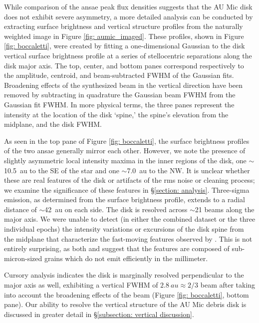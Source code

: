 \documentclass[modern]{aastex62}
\begin{document}
While comparison of the ansae peak flux densities suggests that the AU Mic disk does not exhibit severe asymmetry, a more detailed analysis can be conducted by extracting surface brightness and vertical structure profiles from the naturally weighted image in Figure \ref{fig: aumic_imaged}.
These profiles, shown in Figure \ref{fig: boccaletti}, were created by fitting a one-dimensional Gaussian to the disk vertical surface brightness profile at a series of stellocentric separations along the disk major axis.
The top, center, and bottom panes correspond respectively to the amplitude, centroid, and beam-subtracted FWHM of the Gaussian fits. 
Broadening effects of the synthesized beam in the vertical direction have been removed by subtracting in quadrature the Gaussian beam FWHM from the Gaussian fit FWHM.
In more physical terms, the three panes represent the intensity at the location of the disk `spine,' the spine's elevation from the midplane, and the disk FWHM.

As seen in the top pane of Figure \ref{fig: boccaletti}, the surface brightness profiles of the two ansae generally mirror each other.
However, we note the presence of slightly asymmetric local intensity maxima in the inner regions of the disk, one $\sim$\SI{10.5}{au} to the SE of the star and one $\sim$\SI{7.0}{au} to the NW. 
It is unclear whether these are real features of the disk or artifacts of the rms noise or cleaning process; we examine the significance of these features in \S \ref{section: analysis}.
Three-sigma emission, as determined from the surface brightness profile, extends to a radial distance of $\sim$\SI{42}{au} on each side.
The disk is resolved across $\sim$21 beams along the major axis. 
We were unable to detect (in either the combined dataset or the three individual epochs) the intensity variations or excursions of the disk spine from the midplane that characterize the fast-moving features observed by \citet{boccaletti15,boccaletti18}.
This is not entirely surprising, as both \citet{sezestre17} and \citet{chiang&fung17} suggest that the features are composed of sub-micron-sized grains which do not emit efficiently in the millimeter.

Cursory analysis indicates the disk is marginally resolved perpendicular to the major axis as well, exhibiting a vertical FWHM of $\SI{2.8}{au} \approx 2/3$ beam after taking into account the broadening effects of the beam (Figure \ref{fig: boccaletti}, bottom pane).
Our ability to resolve the vertical structure of the AU Mic debris disk is discussed in greater detail in \S \ref{subsection: vertical discussion}.
\end{document}

